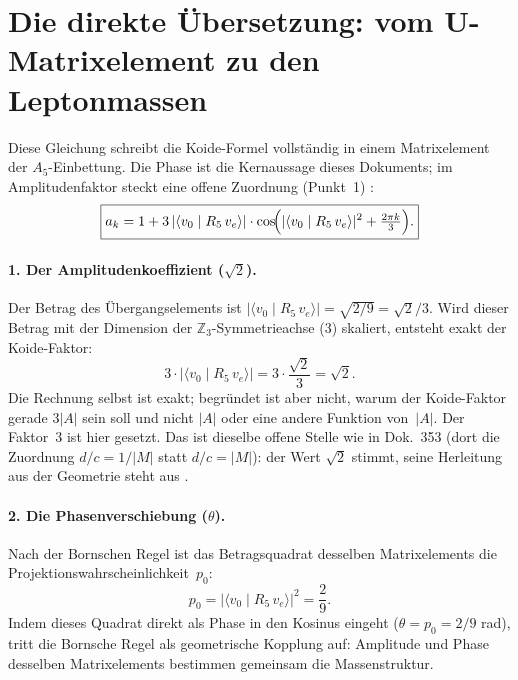 \section{Die direkte Übersetzung: vom U-Matrixelement zu den Leptonmassen}

Diese Gleichung schreibt die Koide-Formel vollständig in einem Matrixelement
der $A_5$-Einbettung. Die Phase ist die Kernaussage dieses Dokuments; im
Amplitudenfaktor steckt eine offene Zuordnung (Punkt~1) \SM:
\begin{equation}\label{eq:direkt}
  \boxed{a_k = 1 + 3\,|\langle v_0 \mid R_5\, v_e\rangle|\cdot
    \cos\!\Bigl(|\langle v_0 \mid R_5\, v_e\rangle|^2 + \tfrac{2\pi k}{3}\Bigr).}
\end{equation}

\paragraph{1. Der Amplitudenkoeffizient ($\sqrt2$).}
Der Betrag des Übergangselements ist
$|\langle v_0 \mid R_5\, v_e\rangle| = \sqrt{2/9} = \sqrt2/3$.
Wird dieser Betrag mit der Dimension der $\mathbb{Z}_3$-Symmetrieachse (3)
skaliert, entsteht exakt der Koide-Faktor:
\[
  3\cdot|\langle v_0 \mid R_5\, v_e\rangle| = 3\cdot\frac{\sqrt2}{3} = \sqrt2.
\]
Die Rechnung selbst ist exakt; begründet ist aber nicht, warum der Koide-Faktor
gerade $3|A|$ sein soll und nicht $|A|$ oder eine andere Funktion von~$|A|$. Der
Faktor~$3$ ist hier gesetzt. Das ist dieselbe offene Stelle wie in Dok.~353 (dort
die Zuordnung $d/c = 1/|M|$ statt $d/c = |M|$): der Wert $\sqrt2$ stimmt, seine
Herleitung aus der Geometrie steht aus \SM.

\paragraph{2. Die Phasenverschiebung ($\theta$).}
Nach der Bornschen Regel ist das Betragsquadrat desselben Matrixelements die
Projektionswahrscheinlichkeit~$p_0$:
\[
  p_0 = |\langle v_0 \mid R_5\, v_e\rangle|^2 = \frac{2}{9}.
\]
Indem dieses Quadrat direkt als Phase in den Kosinus eingeht
($\theta = p_0 = 2/9$ rad), tritt die Bornsche Regel als geometrische
Kopplung auf: Amplitude und Phase desselben Matrixelements bestimmen gemeinsam
die Massenstruktur.

